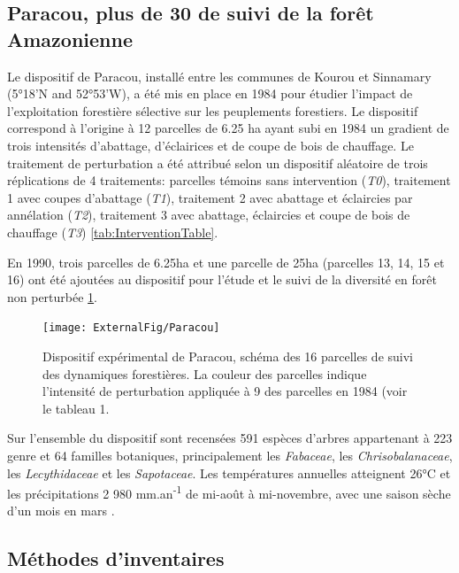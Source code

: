 \documentclass[
  11pt,
  french,
  A4paper,
  extrafontsizes,onecolumn,openright
  ]{memoir}
\begin{document}
\subsection{Paracou, plus de 30 de suivi de la forêt
Amazonienne}\label{paracou-plus-de-30-de-suivi-de-la-foret-amazonienne}

Le dispositif de Paracou, installé entre les communes de Kourou et
Sinnamary (5°18'N and 52°53'W), a été mis en place en 1984 pour étudier
l'impact de l'exploitation forestière sélective sur les peuplements
forestiers. Le dispositif correspond à l'origine à 12 parcelles de 6.25
ha ayant subi en 1984 un gradient de trois intensités d'abattage,
d'éclairices et de coupe de bois de chauffage. Le traitement de
perturbation a été attribué selon un dispositif aléatoire de trois
réplications de 4 traitements: parcelles témoins sans intervention
(\emph{T0}), traitement 1 avec coupes d'abattage (\emph{T1}), traitement
2 avec abattage et éclaircies par annélation (\emph{T2}), traitement 3
avec abattage, éclaircies et coupe de bois de chauffage (\emph{T3})
\ref{tab:InterventionTable}.

En 1990, trois parcelles de 6.25ha et une parcelle de 25ha (parcelles
13, 14, 15 et 16) ont été ajoutées au dispositif pour l'étude et le
suivi de la diversité en forêt non perturbée \ref{fig:ParacouDesign}.

\begin{figure}

{\centering \texttt{[image: ExternalFig/Paracou]} 

}

\caption{Dispositif expérimental de Paracou, schéma des 16 parcelles de suivi des dynamiques forestières. La couleur des parcelles indique l'intensité de perturbation appliquée à 9 des parcelles en 1984 (voir le tableau 1.}\label{fig:ParacouDesign}
\end{figure}

Sur l'ensemble du dispositif sont recensées 591 espèces d'arbres
appartenant à 223 genre et 64 familles botaniques, principalement les
\emph{Fabaceae}, les \emph{Chrisobalanaceae}, les \emph{Lecythidaceae}
et les \emph{Sapotaceae}. Les températures annuelles atteignent 26°C et
les précipitations 2 980 mm.an\textsuperscript{-1} de mi-août à
mi-novembre, avec une saison sèche d'un mois en mars
\autocite{Wagner2011}.

\subsection{Méthodes d'inventaires}\label{methodes-dinventaires}
\end{document}

